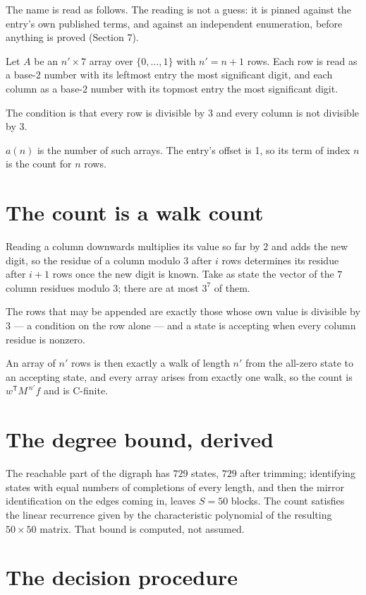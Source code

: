 \documentclass[11pt]{article}
\theoremstyle{definition}
\begin{document}
The name is read as follows. The reading is not a guess: it is pinned against the entry's own published terms, and against an independent enumeration, before anything is proved (Section 7).

Let $A$ be an $n' \times 7$ array over $\{0,\dots,1\}$ with $n' = n + 1$ rows. Each row is read as a base-$2$ number with its leftmost entry the most significant digit, and each column as a base-$2$ number with its topmost entry the most significant digit.

The condition is that every row is divisible by $3$ and every column is not divisible by $3$.

$a(n)$ is the number of such arrays. The entry's offset is 1, so its term of index $n$ is the count for $n$ rows.

\section{The count is a walk count}

Reading a column downwards multiplies its value so far by $2$ and adds the new digit, so the residue of a column modulo $3$ after $i$ rows determines its residue after $i+1$ rows once the new digit is known. Take as state the vector of the $7$ column residues modulo $3$; there are at most $3^{7}$ of them.

The rows that may be appended are exactly those whose own value is divisible by $3$ --- a condition on the row alone --- and a state is accepting when every column residue is nonzero.

An array of $n'$ rows is then exactly a walk of length $n'$ from the all-zero state to an accepting state, and every array arises from exactly one walk, so the count is $w^{\mathsf T}M^{\,n'}f$ and is C-finite.

\section{The degree bound, derived}

The reachable part of the digraph has $729$ states, $729$ after trimming; identifying states with equal numbers of completions of every length, and then the mirror identification on the edges coming in, leaves $S = 50$ blocks. The count satisfies the linear recurrence given by the characteristic polynomial of the resulting $50\times50$ matrix. That bound is computed, not assumed.

\section{The decision procedure}
\end{document}
